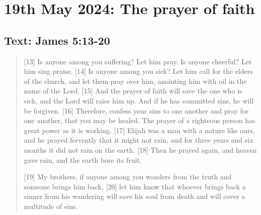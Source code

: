 \setcounter{figure}{0}

\section{19th May 2024: The prayer of faith}
\subsection*{Text: James 5:13-20}
  \begin{quote}
    [13] Is anyone among you suffering? Let him pray. Is anyone cheerful? Let him sing praise. [14] Is anyone among you sick? Let him call for the elders of the church, and let them pray over him, anointing him with oil in the name of the Lord. [15] And the prayer of faith will save the one who is sick, and the Lord will raise him up. And if he has committed sins, he will be forgiven. [16] Therefore, confess your sins to one another and pray for one another, that you may be healed. The prayer of a righteous person has great power as it is working. [17] Elijah was a man with a nature like ours, and he prayed fervently that it might not rain, and for three years and six months it did not rain on the earth. [18] Then he prayed again, and heaven gave rain, and the earth bore its fruit.

    [19] My brothers, if anyone among you wanders from the truth and someone brings him back, [20] let him know that whoever brings back a sinner from his wandering will save his soul from death and will cover a multitude of sins.
  \end{quote}
